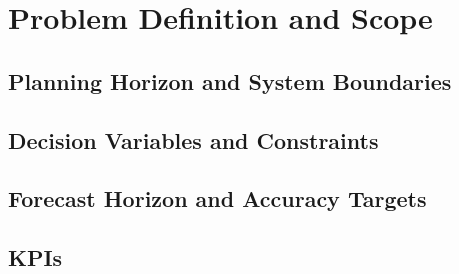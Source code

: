 \newpage
\section{Problem Definition and Scope}

\subsection{Planning Horizon and System Boundaries}

\subsection{Decision Variables and Constraints}

\subsection{Forecast Horizon and Accuracy Targets}

\subsection{KPIs}

\newpage
